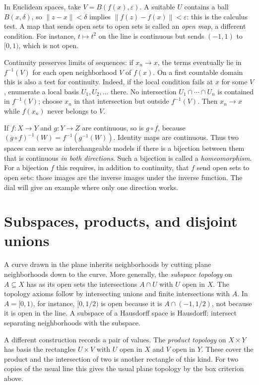 In Euclidean spaces, take $V=B(f(x),\varepsilon)$. A suitable $U$ contains a ball $B(x,\delta)$, so $\|z-x\|<\delta$ implies $\|f(z)-f(x)\|<\varepsilon$: this is the calculus test. A map that sends open sets to open sets is called an \emph{open map}, a different condition. For instance, $t\mapsto t^2$ on the line is continuous but sends $(-1,1)$ to $[0,1)$, which is not open.

Continuity preserves limits of sequences: if $x_n\to x$, the terms eventually lie in $f^{-1}(V)$ for each open neighborhood $V$ of $f(x)$. On a first countable domain this is also a test for continuity. Indeed, if the local condition fails at $x$ for some $V$, enumerate a local basis $U_1,U_2,\ldots$ there. No intersection $U_1\cap\cdots\cap U_n$ is contained in $f^{-1}(V)$; choose $x_n$ in that intersection but outside $f^{-1}(V)$. Then $x_n\to x$ while $f(x_n)$ never belongs to $V$.

If $f:X\to Y$ and $g:Y\to Z$ are continuous, so is $g\circ f$, because $(g\circ f)^{-1}(W)=f^{-1}(g^{-1}(W))$. Identity maps are continuous. Thus two spaces can serve as interchangeable models if there is a bijection between them that is continuous \emph{in both directions}. Such a bijection is called a \emph{homeomorphism}. For a bijection $f$ this requires, in addition to continuity, that $f$ send open sets to open sets: those images are the inverse images under the inverse function. The dial will give an example where only one direction works.

\section{Subspaces, products, and disjoint unions}

A curve drawn in the plane inherits neighborhoods by cutting plane neighborhoods down to the curve. More generally, the \emph{subspace topology} on $A\subseteq X$ has as its open sets the intersections $A\cap U$ with $U$ open in $X$. The topology axioms follow by intersecting unions and finite intersections with $A$. In $A=[0,1)$, for instance, $[0,1/2)$ is open because it is $A\cap(-1,1/2)$, not because it is open in the line. A subspace of a Hausdorff space is Hausdorff: intersect separating neighborhoods with the subspace.

A different construction records a pair of values. The \emph{product topology} on $X\times Y$ has basis the rectangles $U\times V$ with $U$ open in $X$ and $V$ open in $Y$. These cover the product and the intersection of two is another rectangle of this kind. For two copies of the usual line this gives the usual plane topology by the box criterion above.

